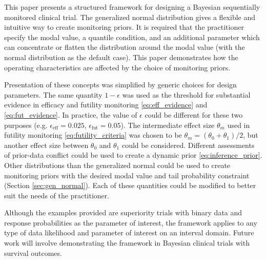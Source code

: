 \documentclass[useAMS,usenatbib,referee]{biom}
\begin{document}
This paper presents a structured framework for designing a Bayesian sequentially monitored clinical trial. The generalized normal distribution gives a flexible and intuitive way to create monitoring priors. It is required that the practitioner specify the modal value, a quantile condition, and an additional parameter which can concentrate or flatten the distribution around the modal value (with the normal distribution as the default case). This paper demonstrates how the operating characteristics are affected by the choice of monitoring priors.

Presentation of these concepts was simplified by generic choices for design parameters. The same quantity $1-\epsilon$ was used as the threshold for substantial evidence in efficacy and futility monitoring \eqref{eq:eff_evidence} and \eqref{eq:fut_evidence}. In practice, the value of $\epsilon$ could be different for these two purposes (e.g. $\epsilon_{\text{eff}}=0.025$, $\epsilon_{\text{fut}}=0.05$). The intermediate effect size $\theta_m$ used in futility monitoring \eqref{eq:futility_criteria} was chosen to be $\theta_m=(\theta_0+\theta_1)/2$, but another effect size between $\theta_0$ and $\theta_1$ could be considered. Different assessments of prior-data conflict could be used to create a dynamic prior \eqref{eq:inference_prior}. Other distributions than the generalized normal could be used to create monitoring priors with the desired modal value and tail probability constraint (Section \ref{sec:gen_normal}). Each of these quantities could be modified to better suit the needs of the practitioner. 

Although the examples provided are superiority trials with binary data and response probabilities as the parameter of interest, the framework applies to any type of data likelihood and parameter of interest on an interval domain. Future work will involve demonstrating the framework in Bayesian clinical trials with survival outcomes.

\end{document}
